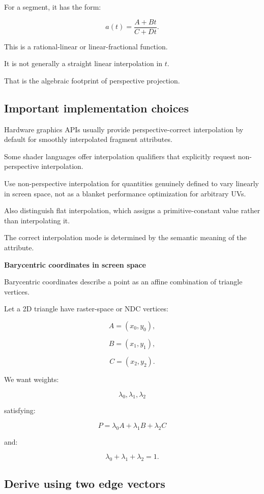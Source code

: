 For a segment, it has the form:

\[
 a(t)= \frac{A+Bt}{C+Dt}.
\]

This is a rational-linear or linear-fractional function.

It is not generally a straight linear interpolation in \(t\).

That is the algebraic footprint of perspective projection.

\subsection{Important implementation choices}\label{02-foundations-ii-ch034-important-implementation-choices}

Hardware graphics APIs usually provide perspective-correct interpolation by default for smoothly interpolated fragment attributes.

Some shader languages offer interpolation qualifiers that explicitly request non-perspective interpolation.

Use non-perspective interpolation for quantities genuinely defined to vary linearly in screen space, not as a blanket performance optimization for arbitrary UVs.

Also distinguish flat interpolation, which assigns a primitive-constant value rather than interpolating it.

The correct interpolation mode is determined by the semantic meaning of the attribute.

\textbf{Barycentric coordinates in screen space}

Barycentric coordinates describe a point as an affine combination of triangle vertices.

Let a 2D triangle have raster-space or NDC vertices:

\[
 A=(x_0,y_0),
\]

\[
 B=(x_1,y_1),
\]

\[
 C=(x_2,y_2).
\]

We want weights:

\[
 \lambda_0,\lambda_1,\lambda_2
\]

satisfying:

\[
 \boxed{ P=\lambda_0A+\lambda_1B+\lambda_2C }
\]

and:

\[
 \boxed{ \lambda_0+\lambda_1+\lambda_2=1 }.
\]

\subsection{Derive using two edge vectors}\label{02-foundations-ii-ch034-derive-using-two-edge-vectors}

